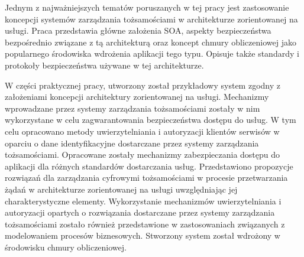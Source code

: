 	Jednym z najważniejszych tematów poruszanych w tej pracy jest zastosowanie koncepcji systemów zarządzania tożsamościami w architekturze zorientowanej na usługi. Praca przedstawia główne założenia SOA, aspekty bezpieczeństwa bezpośrednio związane z tą architekturą oraz koncept chmury obliczeniowej jako popularnego środowiska wdrożenia aplikacji tego typu. Opisuje także standardy i protokoły bezpieczeństwa używane w tej architekturze. 
	
	W części praktycznej pracy, utworzony został przykładowy system zgodny z założeniami koncepcji architektury zorientowanej na usługi. Mechanizmy wprowadzane przez systemy zarządzania tożsamościami zostały w nim wykorzystane w celu zagwarantowania bezpieczeństwa dostępu do usług. W tym celu opracowano metody uwierzytelniania i autoryzacji klientów serwisów w oparciu o dane identyfikacyjne dostarczane przez systemy zarządzania tożsamościami. Opracowane zostały mechanizmy zabezpieczania dostępu do aplikacji dla różnych standardów dostarczania usług. Przedstawiono propozycje rozwiązań dla zarządzania cyfrowymi tożsamościami w procesie przetwarzania żądań w architekturze zorientowanej na usługi uwzględniając jej charakterystyczne elementy. Wykorzystanie mechanizmów uwierzytelniania i autoryzacji opartych o rozwiązania dostarczane przez systemy zarządzania tożsamościami zostało również przedstawione w zastosowaniach związanych z modelowaniem procesów biznesowych. Stworzony system został wdrożony w środowisku chmury obliczeniowej.

